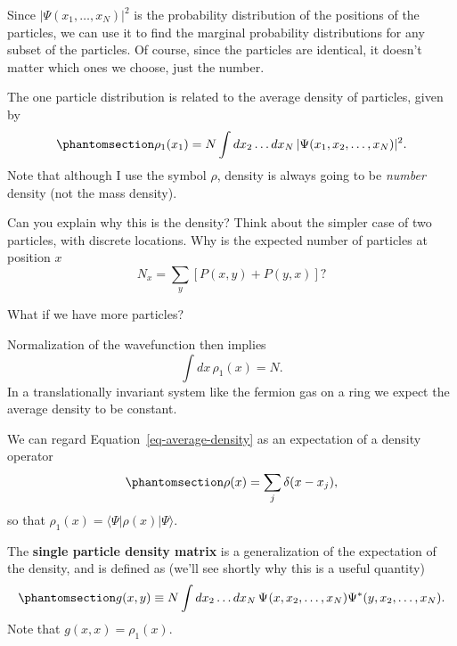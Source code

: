 \documentclass[
  a4paper,
]{scrbook}
\begin{document}
Since \(\lvert\Psi(x_1,\ldots,x_N)\rvert^2\) is the probability
distribution of the positions of the particles, we can use it to find
the marginal probability distributions for any subset of the particles.
Of course, since the particles are identical, it doesn't matter which
ones we choose, just the number.

The one particle distribution is related to the average density of
particles, given by
\begin{equation}\phantomsection\label{eq-average-density}{
\rho_1(x_1) = N \int dx_2\ldots dx_N \,\lvert\Psi(x_1,x_2,\ldots,x_N)\rvert^2.
}\end{equation} Note that although I use the symbol \(\rho\), density is
always going to be \emph{number} density (not the mass density).

\begin{tcolorbox}[enhanced jigsaw, rightrule=.15mm, opacityback=0, bottomtitle=1mm, colbacktitle=quarto-callout-tip-color!10!white, colback=white, toprule=.15mm, titlerule=0mm, arc=.35mm, title=\textcolor{quarto-callout-tip-color}{\faLightbulb}\hspace{0.5em}{Check}, left=2mm, opacitybacktitle=0.6, breakable, leftrule=.75mm, bottomrule=.15mm, colframe=quarto-callout-tip-color-frame, toptitle=1mm, coltitle=black]

Can you explain why this is the density? Think about the simpler case of
two particles, with discrete locations. Why is the expected number of
particles at position \(x\) \[
N_x = \sum_y \left[P(x,y) + P(y,x)\right]?
\]

What if we have more particles?

\end{tcolorbox}

Normalization of the wavefunction then implies \[
\int dx\, \rho_1(x) = N.
\] In a translationally invariant system like the fermion gas on a ring
we expect the average density to be constant.

We can regard Equation~\ref{eq-average-density} as an expectation of a
density operator \begin{equation}\phantomsection\label{eq-density-op}{
\rho(x) = \sum_j \delta(x-x_j),
}\end{equation} so that
\(\rho_1(x) = \langle{\Psi}\rvert \rho(x) \lvert \Psi \rangle\).

The \textbf{single particle density matrix} is a generalization of the
expectation of the density, and is defined as (we'll see shortly why
this is a useful quantity)
\begin{equation}\phantomsection\label{eq-spdm}{
g(x,y) \equiv N\int dx_2\ldots dx_N \,\Psi^{}(x,x_2,\ldots,x_N)\Psi^{*}(y,x_2,\ldots,x_N).
}\end{equation} Note that \(g(x,x) = \rho_1(x)\).
\end{document}
